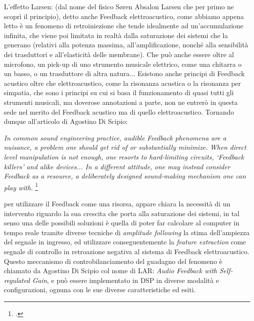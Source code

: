 L'effetto Larsen: (dal nome del fisico Søren Absalon Larsen
che per primo ne scoprì il principio), detto anche Feedback elettroacustico,
come abbiamo appena letto è un fenomeno di retroiniezione che tende idealmente 
ad un'accumulazione infinita, che viene poi limitata in realtà dalla saturazione dei sistemi 
che la generano (relativi alla potenza massima, all'amplificazione, nonché alla sensibilità dei
trasduttori e all'elasticità delle membrane). Che può anche essere oltre al microfono, un
pick-up di uno strumento musicale elettrico, come una chitarra o un basso, o un trasduttore di
altra natura... 
Esistono anche principi di Feedback acustico oltre che elettroacustico, 
come la risonanza acustica o la risonanza per simpatia,
che sono i principi su cui si basa il funzionamento di quasi tutti gli strumenti musicali,
ma doverose annotazioni a parte, non ne entrerò in questa sede nel merito del Feedback acustico
ma di quello elettroacustico.
Tornando dunque all'articolo di Agostino Di Scipio:

\begin{center}
\vspace{0.5cm}
\textit{In common sound engineering practice, audible Feedback phenomena are a nuisance, a problem one
should get rid of or substantially minimize. When direct level manipulation is not enough, one
resorts to hard-limiting circuits, ‘Feedback killers’ and alike devices... 
In a different attitude, one may instead consider Feedback as
a resource, a deliberately designed sound-making mechanism one can play with.} \footcite{di_scipio_relational_2022}
\vspace{0.5cm}
\end{center}

per utilizzare il Feedback come una risorsa,
appare chiara la necessità di un intervento riguardo la sua crescita che porta alla saturazione dei sistemi, 
in tal senso una delle possibili soluzioni è quella di poter far calcolare
al computer in tempo reale tramite diverse tecniche di \textit{amplitude following} la stima dell'ampiezza
del segnale in ingresso, ed utilizzare conseguentemente la \textit{feature extraction} come segnale di controllo in retroazione negativa al sistema di Feedback elettroacustico.
Questo meccanismo di controbilanciamento del guadagno
del fenomeno è chiamato da Agostino Di Scipio col nome di LAR: \textit{Audio Feedback with Self-regulated Gain},
e può essere implementato in DSP in diverse modalità e configurazioni,
ognuna con le sue diverse caratteristiche ed esiti. \\

